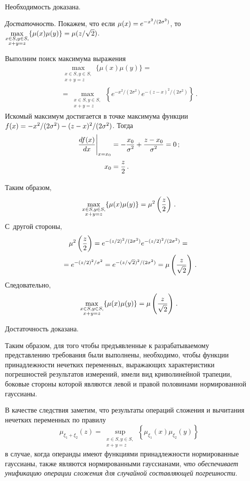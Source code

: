 \begin{multicols}{2}
  Необходимость доказана.
  \smallskip
  
  \textit{Достаточность}. Покажем, что если $\mu(x)\hm= e^{- 
x^2/(2\sigma^2)}$, то $\max\limits_{\substack{{x\in S, y\in S,}\\{x+y=z}}}\{\mu(x) 
\mu(y)\} \hm= \mu(z/\sqrt{2})$.
  
  Выполним поиск максимума выражения 
  \begin{multline*}
  \max\limits_{\substack{{x\in S, y\in S,}\\{x+y=z}}}\{\mu(x)\mu(y)\}={}\\
  {}= \max\limits_{\substack{{x\in S, y\in S,}\\{x+y=z}}}
  \left\{ e^{-x^2/(2\sigma^2)} e^{-(z-x)^2/(2\sigma^2)}\right\}\,. 
  \end{multline*}
Искомый максимум достигается в точке максимума функции $f(x)\hm=-
x^2/(2\sigma^2)\hm- (z-x)^2/(2\sigma^2)$. Тогда 
  \begin{align*}
  \displaystyle\frac{\displaystyle df(x)\mathstrut}{\displaystyle dx\mathstrut}\Bigg\vert_{x=x_0}&=-\displaystyle\frac{\displaystyle x_0\mathstrut}{\displaystyle \sigma^2\mathstrut}+\displaystyle\frac{\displaystyle z-x_0\mathstrut}{\displaystyle \sigma^2\mathstrut}=0\,;\\
  x_0&=\displaystyle\frac{\displaystyle z\mathstrut}{\displaystyle 2\mathstrut}\,.
  \end{align*}
  
  Таким образом, 
  $$
  \max\limits_{\substack{{x\in S, y\in  S,}\\{x+y=z}}}\{\mu(x)\mu(y)\}= \mu^2\left(\displaystyle\frac{\displaystyle z\mathstrut}{\displaystyle 2\mathstrut}\right)\,.
  $$
  С~другой стороны, 
  \begin{multline*}
  \mu^2\left(\displaystyle\frac{\displaystyle z\mathstrut}{\displaystyle 2\mathstrut}\right)= e^{-(z/2)^2/(2\sigma^2)} e^{-(z/2)^2/(2\sigma^2)}={}\\
  {}= e^{-(z/2)^2/\sigma^2}=e^{-(z/\sqrt{2})^2/(2\sigma^2)}=\mu\left(\displaystyle\frac{\displaystyle z\mathstrut}{\displaystyle \sqrt{2}\mathstrut}\right)\,.
  \end{multline*} 
Следовательно, 
$$
\max\limits_{\substack{{x\in S, y\in 
S,}\\{x+y=z}}}\{\mu(x)\mu(y)\}\hm= \mu\left(\fr{z}{\sqrt{2}}\right)\,.
$$ 

Достаточность доказана. 
  
  \smallskip
  
  Таким образом, для того чтобы предъявленные к разрабатываемому 
представлению требования были выполнены, необходимо, чтобы функции 
принадлежности нечетких переменных, выражающих характеристики 
погрешностей результатов измерений, имели вид криволинейной трапеции, 
боковые стороны которой являются левой и правой половинами 
нормированной гауссианы.
  
  В качестве следствия заметим, что результаты операций сложения и 
вычитания нечетких переменных по правилу 
$$
\mu_{\xi_1+\xi_2}(z)= 
\sup\limits_{\substack{{x\in S, y\in S,}\\{x+y=z}}}
\left\{\mu_{\xi_1}(x)\mu_{\xi_2}(y)\right\}
$$ 
в случае, когда операнды имеют функциями 
принадлежности нормированные гауссианы, также являются нормированными 
гауссианами, \textit{что обеспечивает унификацию операции сложения для 
случайной составляющей погрешности}.
  

\end{multicols}
